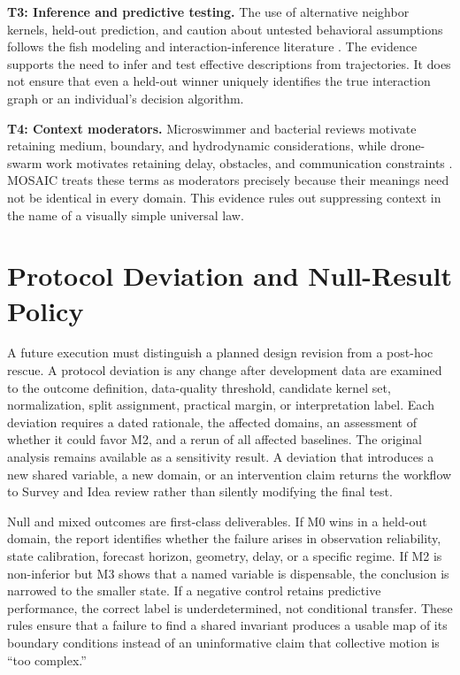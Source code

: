 \documentclass[conference]{../../../../Conference-LaTeX-template_10-17-19/IEEEtran}
\begin{document}
\noindent\textbf{T3: Inference and predictive testing.} The use of alternative neighbor kernels, held-out prediction, and caution about untested behavioral assumptions follows the fish modeling and interaction-inference literature \cite{lopez,katz}. The evidence supports the need to infer and test effective descriptions from trajectories. It does not ensure that even a held-out winner uniquely identifies the true interaction graph or an individual's decision algorithm.

\noindent\textbf{T4: Context moderators.} Microswimmer and bacterial reviews motivate retaining medium, boundary, and hydrodynamic considerations, while drone-swarm work motivates retaining delay, obstacles, and communication constraints \cite{elgeti,lauga,vasarhelyi}. MOSAIC treats these terms as moderators precisely because their meanings need not be identical in every domain. This evidence rules out suppressing context in the name of a visually simple universal law.

\section{Protocol Deviation and Null-Result Policy}
A future execution must distinguish a planned design revision from a post-hoc rescue. A protocol deviation is any change after development data are examined to the outcome definition, data-quality threshold, candidate kernel set, normalization, split assignment, practical margin, or interpretation label. Each deviation requires a dated rationale, the affected domains, an assessment of whether it could favor M2, and a rerun of all affected baselines. The original analysis remains available as a sensitivity result. A deviation that introduces a new shared variable, a new domain, or an intervention claim returns the workflow to Survey and Idea review rather than silently modifying the final test.

Null and mixed outcomes are first-class deliverables. If M0 wins in a held-out domain, the report identifies whether the failure arises in observation reliability, state calibration, forecast horizon, geometry, delay, or a specific regime. If M2 is non-inferior but M3 shows that a named variable is dispensable, the conclusion is narrowed to the smaller state. If a negative control retains predictive performance, the correct label is underdetermined, not conditional transfer. These rules ensure that a failure to find a shared invariant produces a usable map of its boundary conditions instead of an uninformative claim that collective motion is ``too complex.''
\end{document}
